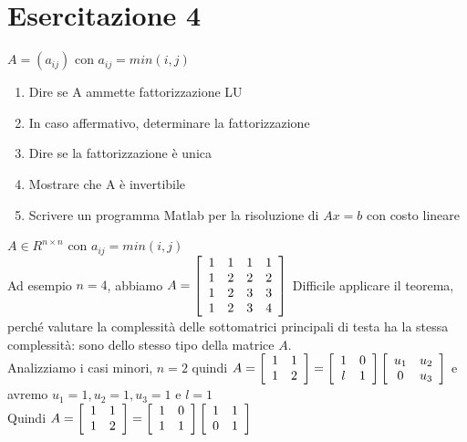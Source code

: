 \documentclass[10pt]{book}
\begin{document}
\section{Esercitazione 4}
$A = (a_{ij})$ con $a_{ij} = min(i, j)$
\begin{enumerate}
	\item Dire se A ammette fattorizzazione LU
	\item In caso affermativo, determinare la fattorizzazione
	\item Dire se la fattorizzazione è unica
	\item Mostrare che A è invertibile
	\item Scrivere un programma Matlab per la risoluzione di $Ax = b$ con costo lineare
\end{enumerate}
$A \in R^{n \times n}$ con $a_{ij} = min(i, j)$\\
Ad esempio $n = 4$, abbiamo
\begin{math}
A = \left[
\begin{array}{c c c c}
	1 & 1 & 1 & 1\\
	1 & 2 & 2 & 2\\
	1 & 2 & 3 & 3\\
	1 & 2 & 3 & 4
\end{array}
\right]
\end{math}
Difficile applicare il teorema, perché valutare la complessità delle sottomatrici principali di testa ha la stessa complessità: sono dello stesso tipo della matrice $A$.\\
Analizziamo i casi minori, $n = 2$ quindi \begin{math}
A = \left[
\begin{array}{c c}
	1 & 1\\
	1 & 2
\end{array}
\right]
= \left[
\begin{array}{c c}
	1 & 0\\
	l & 1
\end{array}
\right]
\left[
\begin{array}{c c}
	u_1 & u_2\\
	0 & u_3
\end{array}
\right]
\end{math}
e avremo $u_1 = 1, u_2 = 1, u_3 = 1$ e $l = 1$\\
Quindi \begin{math}
A = \left[
\begin{array}{c c}
	1 & 1\\
	1 & 2
\end{array}
\right]
= \left[
\begin{array}{c c}
	1 & 0\\
	1 & 1
\end{array}
\right]
\left[
\begin{array}{c c}
	1 & 1\\
	0 & 1
\end{array}
\right]
\end{math}\\
\end{document}
